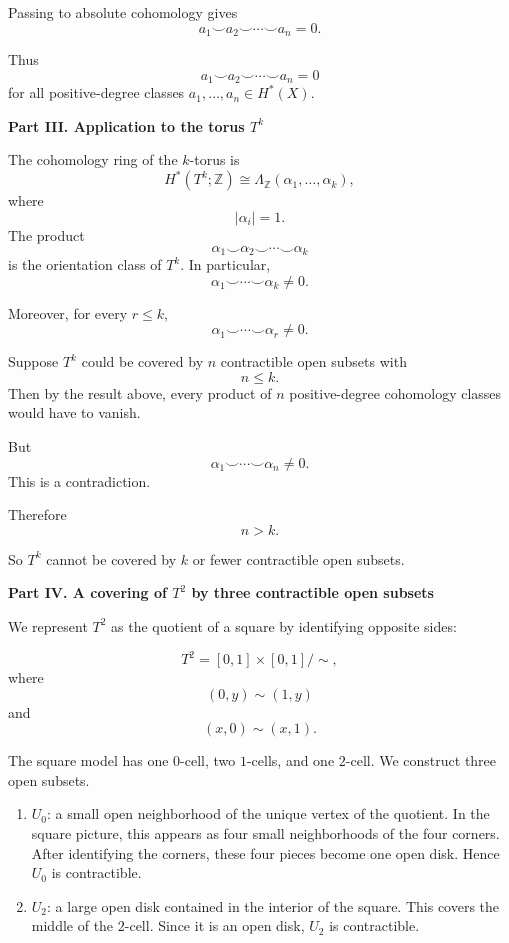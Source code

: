 \begin{solution}
Passing to absolute cohomology gives
\[
a_1\smile a_2\smile \cdots \smile a_n=0.
\]

Thus
\[
\boxed{
	a_1\smile a_2\smile\cdots\smile a_n=0
}
\]
for all positive-degree classes \(a_1,\dots,a_n\in H^*(X)\).


\medskip
\noindent\textbf{Part III. Application to the torus \(T^k\)}\par
\smallskip


The cohomology ring of the \(k\)-torus is
\[
H^*(T^k;\mathbb Z)
\cong
\Lambda_{\mathbb Z}(\alpha_1,\dots,\alpha_k),
\]
where
\[
|\alpha_i|=1.
\]
The product
\[
\alpha_1\smile \alpha_2\smile\cdots\smile \alpha_k
\]
is the orientation class of \(T^k\). In particular,
\[
\alpha_1\smile \cdots\smile \alpha_k\neq 0.
\]

Moreover, for every \(r\leq k\),
\[
\alpha_1\smile\cdots\smile\alpha_r\neq 0.
\]

Suppose \(T^k\) could be covered by \(n\) contractible open subsets with
\[
n\leq k.
\]
Then by the result above, every product of \(n\) positive-degree cohomology classes would have to vanish.

But
\[
\alpha_1\smile\cdots\smile\alpha_n\neq 0.
\]
This is a contradiction.

Therefore
\[
\boxed{
	n>k.
}
\]

So \(T^k\) cannot be covered by \(k\) or fewer contractible open subsets.


\medskip
\noindent\textbf{Part IV. A covering of \(T^2\) by three contractible open subsets}\par
\smallskip


We represent \(T^2\) as the quotient of a square by identifying opposite sides:

\[
T^2
=
[0,1]\times[0,1]/\sim,
\]
where
\[
(0,y)\sim (1,y)
\]
and
\[
(x,0)\sim (x,1).
\]

The square model has one \(0\)-cell, two \(1\)-cells, and one \(2\)-cell. We construct three open subsets.

\begin{enumerate}
	\item \(U_0\): a small open neighborhood of the unique vertex of the quotient. In the square picture, this appears as four small neighborhoods of the four corners. After identifying the corners, these four pieces become one open disk. Hence \(U_0\) is contractible.

	\item \(U_2\): a large open disk contained in the interior of the square. This covers the middle of the \(2\)-cell. Since it is an open disk, \(U_2\) is contractible.


\end{enumerate}
\end{solution}
